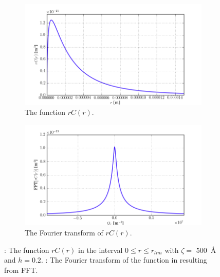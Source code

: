 \documentclass[10pt,twoside, b5paper,pdftex]{report}
\begin{document}
\begin{figure}[htbp]
	\centering
	\begin{subfigure}{0.425\textwidth}
	  \includegraphics[width=\textwidth]{figures/rCr.png}
	  \caption{The function $rC(r)$.}
	  \label{subfig:rCr}	
	\end{subfigure}
	\begin{subfigure}{0.425\textwidth}
	  \includegraphics[width=\textwidth]{figures/FFTrCr.png}
	  \caption{The Fourier transform of $rC(r)$.}
	  \label{subfig:FFTrCr}	
	\end{subfigure}
	\caption{: The function $rC(r)$ in the interval $0\leq r \leq r_{lim}$  with $\zeta =$ \SI{500}{\angstrom} and $h = 0.2$. : The Fourier transform of the function in  resulting from FFT. \label{fig:FT}}
\end{figure}
\end{document}
